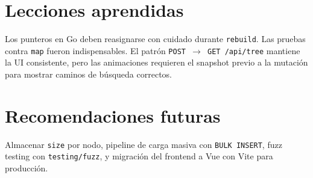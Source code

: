 \section{Lecciones aprendidas}

Los punteros en Go deben reasignarse con cuidado durante \texttt{rebuild}. Las pruebas contra \texttt{map} fueron indispensables. El patrón \texttt{POST $\rightarrow$ GET /api/tree} mantiene la UI consistente, pero las animaciones requieren el snapshot previo a la mutación para mostrar caminos de búsqueda correctos.

\section{Recomendaciones futuras}

Almacenar \texttt{size} por nodo, pipeline de carga masiva con \texttt{BULK INSERT}, fuzz testing con \texttt{testing/fuzz}, y migración del frontend a Vue con Vite para producción.
